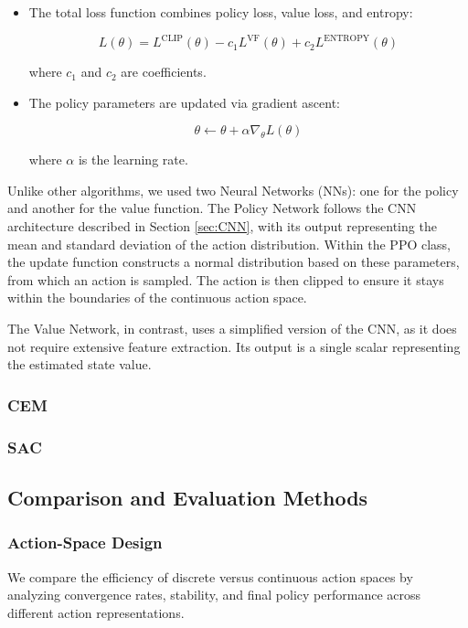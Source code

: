 \documentclass[../CSC_52081_EP.tex]{subfiles}
\begin{document}
\begin{itemize}
    \item The total loss function combines policy loss, value loss, and entropy:
    
    \[
    L(\theta) = L^{\text{CLIP}}(\theta) - c_1 L^{\text{VF}}(\theta) + c_2 L^{\text{ENTROPY}}(\theta)
    \]
    
    where \( c_1 \) and \( c_2 \) are coefficients.
    
    \item The policy parameters are updated via gradient ascent:
    
    \[
    \theta \leftarrow \theta + \alpha \nabla_{\theta} L(\theta)
    \]
    
    where \( \alpha \) is the learning rate.
    
\end{itemize}

Unlike other algorithms, we used two Neural Networks (NNs): one for the policy and another for the value function. The Policy Network follows the CNN architecture described in Section \ref{sec:CNN}, with its output representing the mean and standard deviation of the action distribution. Within the PPO class, the update function constructs a normal distribution based on these parameters, from which an action is sampled. The action is then clipped to ensure it stays within the boundaries of the continuous action space.

The Value Network, in contrast, uses a simplified version of the CNN, as it does not require extensive feature extraction. Its output is a single scalar representing the estimated state value.

\hspace{1cm}
\subsubsection{CEM}


\hspace{1cm}
\subsubsection{SAC}



\subsection{Comparison and Evaluation Methods}

\subsubsection{Action-Space Design}
We compare the efficiency of discrete versus continuous action spaces by analyzing convergence rates, stability, and final policy performance across different action representations.
\end{document}
